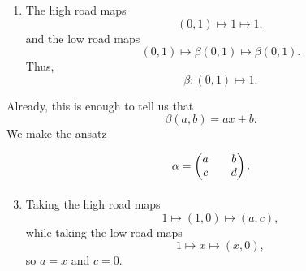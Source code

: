 \documentclass[main.tex]{subfiles}
\begin{document}
\begin{example}
\begin{enumerate}[label=(\arabic*)]
    \item The high road maps
      \begin{equation*}
        (0, 1) \mapsto 1 \mapsto 1,
      \end{equation*}
      and the low road maps
      \begin{equation*}
        (0, 1) \mapsto \beta(0, 1) \mapsto \beta(0, 1).
      \end{equation*}
      Thus, 
      \begin{equation*}
        \beta\colon (0, 1) \mapsto 1.
      \end{equation*}
  \end{enumerate}
  Already, this is enough to tell us that
  \begin{equation*}
    \beta(a, b) = ax + b.
  \end{equation*}
  We make the ansatz
  \begin{equation*}
    \begin{tikzcd}
      \alpha =
      \begin{pmatrix}
        a & b \\
        c & d
      \end{pmatrix}.
    \end{tikzcd}
  \end{equation*}
  \begin{enumerate}[label=(\arabic*)]\setcounter{enumi}{2}
    \item Taking the high road maps
      \begin{equation*}
        1 \mapsto (1, 0) \mapsto (a, c),
      \end{equation*}
      while taking the low road maps
      \begin{equation*}
        1 \mapsto x \mapsto (x, 0),
      \end{equation*}
      so $a = x$ and $c = 0$.


\end{enumerate}
\end{example}
\end{document}
